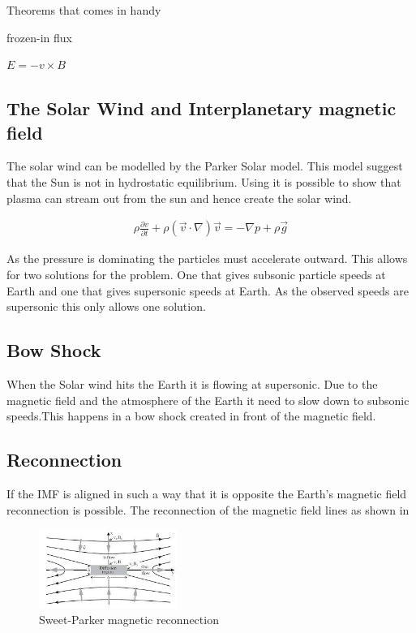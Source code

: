 

Theorems that comes in handy

frozen-in flux

$E = -v \times B$

\subsection{The Solar Wind and Interplanetary magnetic field}

The solar wind can be modelled by the Parker Solar model. This model suggest that the Sun is not in hydrostatic equilibrium. Using  it is possible to show that plasma can stream out from the sun and hence create the solar wind. 

\begin{align}
\rho \frac{\partial v}{\partial t} + \rho (\vec{v} \cdot \nabla )\vec{v} = -\nabla p + \rho \vec{g}
\label{eq:mo}
\end{align}


As the pressure is dominating the particles must accelerate outward. This allows for two solutions for the problem. One that gives subsonic particle speeds at Earth and one that gives supersonic speeds at Earth. As the observed speeds are supersonic this only allows one solution. 


\subsection{Bow Shock}

When the Solar wind hits the Earth it is flowing at supersonic. Due to the magnetic field and the atmosphere of the Earth it need to slow down to subsonic speeds.This happens in a bow shock created  in front of the magnetic field. 


\subsection{Reconnection}

If the IMF is aligned in such a way that it is opposite the Earth's magnetic field reconnection is possible.  The reconnection of the magnetic field lines as shown in 

\begin{figure} 
\vspace{-30pt}
  \begin{center}
    \includegraphics[width=0.4\textwidth]{Figures/reconnection.jpg}
    \caption{Sweet-Parker magnetic reconnection}
    \label{fig:rec}
  \end{center}
  \vspace{-30pt}
  \vspace{1pt}
\end{figure}


